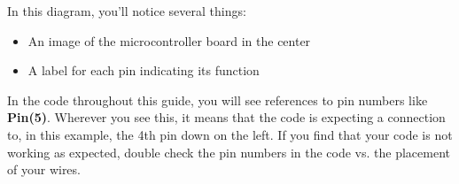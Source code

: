 In this diagram, you'll notice several things:
\begin{itemize}
    \item An image of the microcontroller board in the center
    \item A label for each pin indicating its function
\end{itemize}

In the code throughout this guide, you will see references to pin numbers like \textbf{Pin(5)}.
Wherever you see this, it means that the code is expecting a connection to, in this example, the
4th pin down on the left. If you find that your code is not working as expected, double check the
pin numbers in the code vs. the placement of your wires.